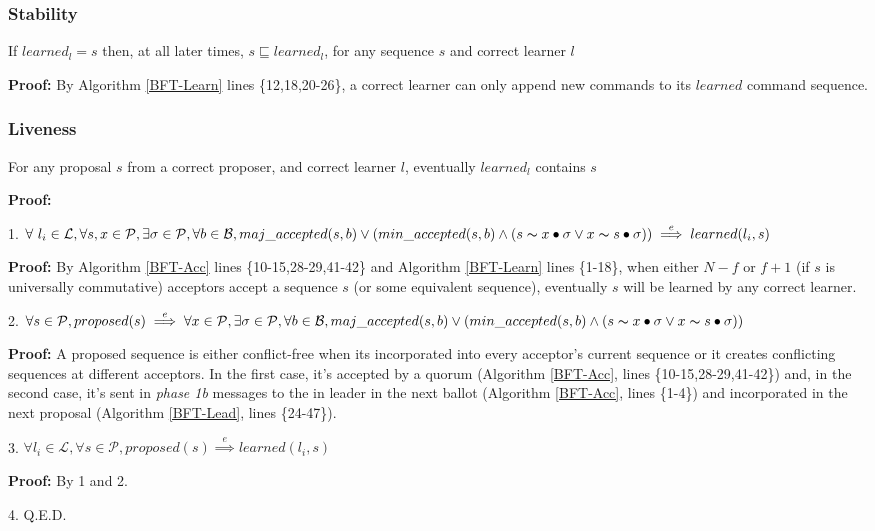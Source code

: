\subsubsection{Stability}
\begin{theorem}
If $learned_l = s$ then, at all later times, $s \sqsubseteq learned_l$, for any sequence $s$ and correct learner $l$ \par
\end{theorem} 
\textbf{Proof:} By Algorithm \ref{BFT-Learn} lines \{12,18,20-26\}, a correct learner can only append new commands to its $learned$ command sequence.

\subsubsection{Liveness}
\begin{theorem}
For any proposal $s$ from a correct proposer, and correct learner $l$, eventually $learned_l$ contains $s$\par
\end{theorem} 
\parbox{\linewidth}{\textbf{Proof:}} \par
\parbox{\linewidth-\algorithmicindent}{\strut1. $\forall\ l_i \in \mathcal{L},\forall s,x \in \mathcal{P}, \exists \sigma \in \mathcal{P}, \forall b \in \mathcal{B}, maj\_accepted(s,b) \lor (min\_accepted(s,b) \land  (s \thicksim x \bullet \sigma \lor x \thicksim s \bullet \sigma))\overset{e}{\implies} learned(l_i,s)$}\par
\indent\indent\parbox{\linewidth-\algorithmicindent*2}{\strut\textbf{Proof:} By Algorithm \ref{BFT-Acc} lines \{10-15,28-29,41-42\} and Algorithm \ref{BFT-Learn} lines \{1-18\}, when either $N-f$ or $f+1$ (if $s$ is universally commutative) acceptors accept a sequence $s$ (or some equivalent sequence), eventually $s$ will be learned by any correct learner.}\par
\parbox{\linewidth-\algorithmicindent}{\strut2. $\forall s \in \mathcal{P}, proposed(s) \overset{e}{\implies} \forall x \in \mathcal{P}, \exists \sigma \in \mathcal{P}, \forall b \in \mathcal{B}, maj\_accepted(s,b) \lor (min\_accepted(s,b) \land  (s \thicksim x \bullet \sigma \lor x \thicksim s \bullet \sigma))$} \par
\indent\indent\parbox{\linewidth-\algorithmicindent*2}{\strut\textbf{Proof:} A proposed sequence is either conflict-free when its incorporated into every acceptor's current sequence or it creates conflicting sequences at different acceptors. In the first case, it's accepted by a quorum (Algorithm \ref{BFT-Acc}, lines \{10-15,28-29,41-42\}) and, in the second case, it's sent in \textit{phase 1b} messages to the in leader in the next ballot (Algorithm \ref{BFT-Acc}, lines \{1-4\}) and incorporated in the next proposal (Algorithm \ref{BFT-Lead}, lines \{24-47\}).} \par
\parbox{\linewidth}{\strut3. $\forall l_i \in \mathcal{L}, \forall s \in \mathcal{P}, proposed(s) \overset{e}{\implies} learned(l_i,s)$} \par
\indent\indent\parbox{\linewidth}{\strut\textbf{Proof:} By 1 and 2.} \par
\parbox{\linewidth}{\strut4. Q.E.D.}